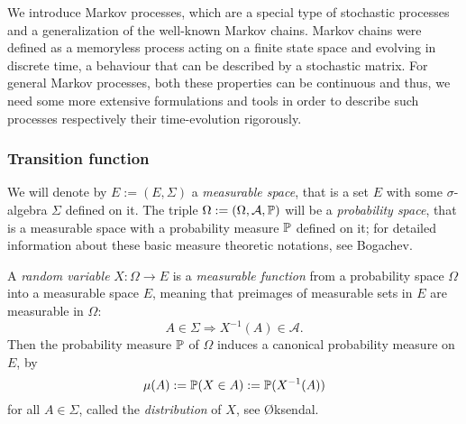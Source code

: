 
We introduce Markov processes, which are a special type of stochastic processes and a generalization of the well-known Markov chains. Markov chains were defined as a memoryless process acting on a finite state space and evolving in discrete time, a behaviour that can be described by a stochastic matrix.
For general Markov processes, both these properties can be continuous and thus, we need some more extensive formulations and tools in order to describe such processes respectively their time-evolution rigorously.

\subsubsection*{Transition function}


We will denote by $E := (E,\Sigma)$ a \textit{measurable space}, that is a set $E$ with some $\sigma$-algebra $\Sigma$ defined on it. The triple $\Omega := (\Omega, \mathcal{A}, \mathbb{P})$ will be a \textit{probability space}, that is a
measurable space with a probability measure $\mathbb{P}$ defined on it; for detailed information about these basic measure theoretic notations, see Bogachev\cite[chapter~1]{bogachev2007measure}.

A \textit{random variable} $X: \Omega \rightarrow E$ is a \textit{measurable function} from a probability space $\Omega$ into a measurable space $E$, meaning that preimages of measurable sets in $E$ are measurable in $\Omega$:
\begin{equation*}
A \in \Sigma \Rightarrow X^{-1}(A) \in \mathcal{A}.
\end{equation*}
Then the probability measure $\mathbb{P}$ of $\Omega$ induces a canonical probability measure on $E$, by
\begin{equation*}
\mu(A) := \mathbb{P}(X \in A) := \mathbb{P}(X^{-1}(A))
\end{equation*}
for all $A \in \Sigma$, called the \textit{distribution} of $X$, see {\O}ksendal\cite[Section 2.1]{oksendal2003stochastic}.

